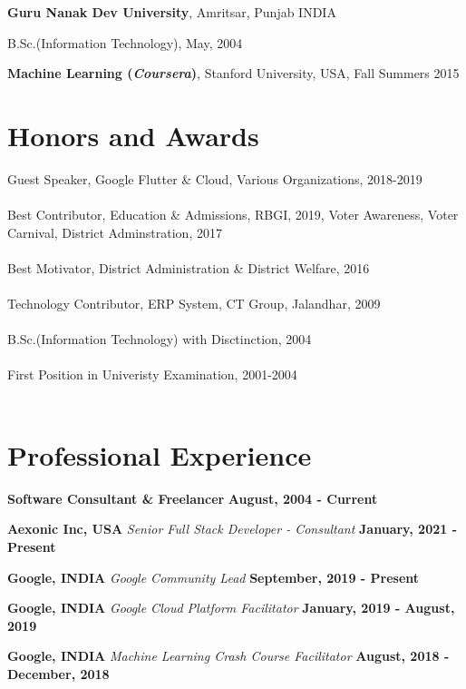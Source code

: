 \documentclass[margin,line]{res}
\newenvironment{list1}{
  \begin{list}{\ding{113}}{%
      \setlength{\itemsep}{0in}
      \setlength{\parsep}{0in} \setlength{\parskip}{0in}
      \setlength{\topsep}{0in} \setlength{\partopsep}{0in}
      \setlength{\leftmargin}{0.17in}}}{\end{list}}
\begin{document}
\begin{resume}
{\bf Guru Nanak Dev University}, Amritsar, Punjab INDIA\\
\vspace*{-.1in}
\begin{list1}
\item[] B.Sc.(Information Technology),  May, 2004
\end{list1}

{\bf Machine Learning (\textit{Coursera})}, Stanford University, USA, Fall Summers 2015\\
\vspace*{-.1in}

\section{\sc Honors and Awards}
Guest Speaker, Google Flutter \& Cloud, Various Organizations, 2018-2019\\\\
Best Contributor, Education \& Admissions, RBGI, 2019,
Voter Awareness, Voter Carnival, District Adminstration, 2017\\\\
Best Motivator, District Administration \& District Welfare, 2016\\\\
Technology Contributor, ERP System, CT Group, Jalandhar, 2009\\\\
B.Sc.(Information Technology) with Disctinction, 2004\\\\
First Position in Univeristy Examination, 2001-2004\\\\

\section{\sc Professional Experience}

{\bf Software Consultant \& Freelancer} \hfill {\bf August, 2004 - Current}

{\bf Aexonic Inc, USA}
{\em Senior Full Stack Developer - Consultant} \hfill {\bf January, 2021 - Present}

{\bf Google, INDIA}
{\em Google Community Lead} \hfill {\bf September, 2019 - Present}

{\bf Google, INDIA}
{\em Google Cloud Platform Facilitator} \hfill {\bf January, 2019 - August, 2019}

{\bf Google, INDIA}
{\em Machine Learning Crash Course Facilitator} \hfill {\bf August, 2018 - December, 2018}


\end{resume}
\end{document}
